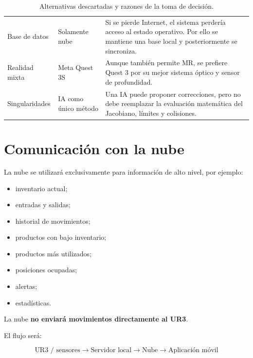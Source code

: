\documentclass[12pt,letterpaper]{article}
\begin{document}
\begin{table}[H]
\begin{tabularx}{\textwidth}{
    >{\raggedright\arraybackslash}p{3.6cm}
    >{\raggedright\arraybackslash}p{3cm}
    X
}
Base de datos &
Solamente nube &
Si se pierde Internet, el sistema perdería acceso al estado operativo. Por ello se mantiene una base local y posteriormente se sincroniza. \\

Realidad mixta &
Meta Quest 3S &
Aunque también permite MR, se prefiere Quest 3 por su mejor sistema óptico y sensor de profundidad. \\

Singularidades &
IA como único método &
Una IA puede proponer correcciones, pero no debe reemplazar la evaluación matemática del Jacobiano, límites y colisiones. \\

\bottomrule
\end{tabularx}

\caption{Alternativas descartadas y razones de la toma de decisión.}

\end{table}

\section{Comunicación con la nube}

La nube se utilizará exclusivamente para información de alto nivel,
por ejemplo:

\begin{itemize}[leftmargin=1.2cm]

    \item inventario actual;
    \item entradas y salidas;
    \item historial de movimientos;
    \item productos con bajo inventario;
    \item productos más utilizados;
    \item posiciones ocupadas;
    \item alertas;
    \item estadísticas.

\end{itemize}

La nube \textbf{no enviará movimientos directamente al UR3}.

El flujo será:

\[
\text{UR3 / sensores}
\rightarrow
\text{Servidor local}
\rightarrow
\text{Nube}
\rightarrow
\text{Aplicación móvil}
\]
\end{document}
